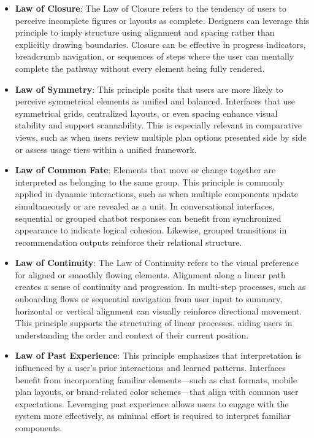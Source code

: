 \documentclass[conference]{IEEEtran}
\begin{document}
\begin{itemize}
\begin{itemize}
        \item \textbf{Law of Closure}: The Law of Closure refers to the tendency of users to perceive incomplete figures or layouts as complete. Designers can leverage this principle to imply structure using alignment and spacing rather than explicitly drawing boundaries. Closure can be effective in progress indicators, breadcrumb navigation, or sequences of steps where the user can mentally complete the pathway without every element being fully rendered.
        \item \textbf{Law of Symmetry}: This principle posits that users are more likely to perceive symmetrical elements as unified and balanced. Interfaces that use symmetrical grids, centralized layouts, or even spacing enhance visual stability and support scannability. This is especially relevant in comparative views, such as when users review multiple plan options presented side by side or assess usage tiers within a unified framework.
        \item \textbf{Law of Common Fate}: Elements that move or change together are interpreted as belonging to the same group. This principle is commonly applied in dynamic interactions, such as when multiple components update simultaneously or are revealed as a unit. In conversational interfaces, sequential or grouped chatbot responses can benefit from synchronized appearance to indicate logical cohesion. Likewise, grouped transitions in recommendation outputs reinforce their relational structure.

        \item \textbf{Law of Continuity}: The Law of Continuity refers to the visual preference for aligned or smoothly flowing elements. Alignment along a linear path creates a sense of continuity and progression. In multi-step processes, such as onboarding flows or sequential navigation from user input to summary, horizontal or vertical alignment can visually reinforce directional movement. This principle supports the structuring of linear processes, aiding users in understanding the order and context of their current position.

        \item \textbf{Law of Past Experience}: This principle emphasizes that interpretation is influenced by a user's prior interactions and learned patterns. Interfaces benefit from incorporating familiar elements—such as chat formats, mobile plan layouts, or brand-related color schemes—that align with common user expectations. Leveraging past experience allows users to engage with the system more effectively, as minimal effort is required to interpret familiar components.


\end{itemize}
\end{itemize}
\end{document}
